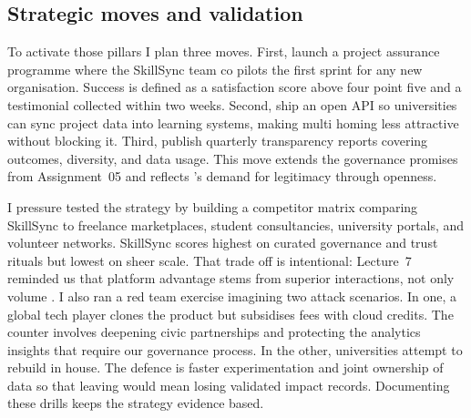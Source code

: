 \subsection*{Strategic moves and validation}
To activate those pillars I plan three moves. First, launch a project assurance programme where the SkillSync team co pilots the first sprint for any new organisation. Success is defined as a satisfaction score above four point five and a testimonial collected within two weeks. Second, ship an open API so universities can sync project data into learning systems, making multi homing less attractive without blocking it. Third, publish quarterly transparency reports covering outcomes, diversity, and data usage. This move extends the governance promises from Assignment~05 and reflects \citet{Srnicek2017}'s demand for legitimacy through openness.

I pressure tested the strategy by building a competitor matrix comparing SkillSync to freelance marketplaces, student consultancies, university portals, and volunteer networks. SkillSync scores highest on curated governance and trust rituals but lowest on sheer scale. That trade off is intentional: Lecture~7 reminded us that platform advantage stems from superior interactions, not only volume \citep{Lecture07}. I also ran a red team exercise imagining two attack scenarios. In one, a global tech player clones the product but subsidises fees with cloud credits. The counter involves deepening civic partnerships and protecting the analytics insights that require our governance process. In the other, universities attempt to rebuild in house. The defence is faster experimentation and joint ownership of data so that leaving would mean losing validated impact records. Documenting these drills keeps the strategy evidence based.
